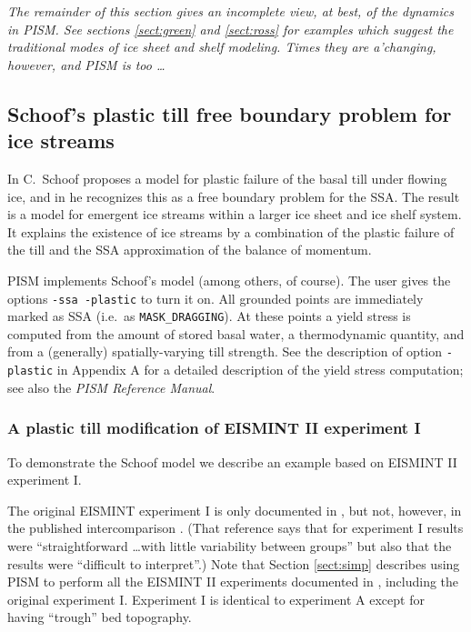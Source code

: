 \documentclass[11pt,final]{amsart}
\begin{document}
\emph{The remainder of this section gives an incomplete view, at best, of the dynamics in PISM.  See sections \ref{sect:green} and \ref{sect:ross} for examples which suggest the traditional modes of ice sheet and shelf modeling.  Times they are a'changing, however, and PISM is too \dots}

\subsection{Schoof's plastic till free boundary problem for ice streams} \label{subsect:plastic}    In \cite{SchoofTill} C.~Schoof proposes a model for plastic failure of the basal till under flowing ice, and in \cite{SchoofStream} he recognizes this as a free boundary problem for the SSA.  The result is a model for emergent ice streams within a larger ice sheet and ice shelf system.  It explains the existence of ice streams by a combination of the plastic failure of the till and the SSA approximation of the balance of momentum.

PISM implements Schoof's model (among others, of course).  The user gives the options \verb|-ssa -plastic| to turn it on.  All grounded points are immediately marked as SSA (i.e.~as \verb|MASK_DRAGGING|).  At these points a yield stress is computed from the amount of stored basal water, a thermodynamic quantity, and from a (generally) spatially-varying till strength.  See the description of option \verb|-plastic| in Appendix A for a detailed description of the yield stress computation; see also the \emph{PISM Reference Manual}.


\subsubsection*{A plastic till modification of EISMINT II experiment I}  To demonstrate the Schoof model we describe an example based on EISMINT II experiment I.

The original EISMINT experiment I is only documented in \cite{EISIIdescribe}, but not, however, in the published intercomparison \cite{EISMINT00}.  (That reference says that for experiment I results were ``straightforward \dots with little variability between groups'' but also that the results were ``difficult to interpret''.)  Note that Section \ref{sect:simp} describes using PISM to perform all the EISMINT II experiments documented in \cite{EISIIdescribe}, including the original experiment I.  Experiment I is identical to experiment A except for having ``trough'' bed topography.  
\end{document}

